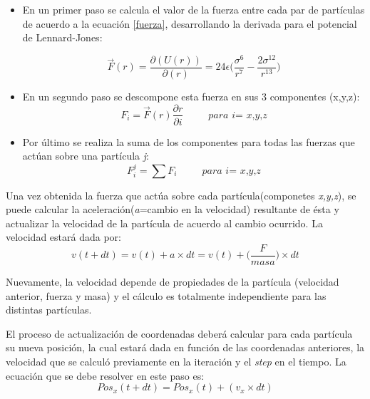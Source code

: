 \begin{itemize}
\item En un primer paso se calcula el valor de la fuerza entre cada par de partículas de acuerdo a la ecuación \ref{fuerza}, desarrollando la derivada para el potencial de Lennard-Jones:

\begin{equation} 
  \vec{F}(r)=\dfrac{\partial(U(r)) }{ \partial(r)}  =  24\epsilon \bigg(\dfrac{{\sigma}^{6}}{{r}^{7}} - \dfrac{2{\sigma}^{12}} {{r}^{13}}\bigg)
\end{equation}


\item En un segundo paso se descompone esta fuerza en sus 3 componentes (x,y,z): \begin{equation}                                                                                
F_i=\vec{F}(r)\dfrac{\partial r}{\partial i}  \hspace{30pt} \textit{para i= x,y,z}
                                                                                 \end{equation}

\item Por último se realiza la suma de los componentes para todas las fuerzas que actúan sobre una partícula \textit{j}: 
\begin{equation}
F^j_i=\sum F_i	\hspace{30pt} \textit{para i= x,y,z}
\end{equation}

\end{itemize}



Una vez obtenida la fuerza que actúa sobre cada partícula(componetes \textit{x,y,z}), se puede calcular la aceleración(\textit{a}=cambio en la velocidad) resultante de ésta y actualizar la velocidad de la partícula de acuerdo al cambio ocurrido.
La velocidad estará dada por:
 \begin{equation} 
    v(t+dt)= v(t) + a\times dt =  v(t) + \bigg(\frac{F}{masa}\bigg)\times dt
 \end{equation}

Nuevamente, la velocidad depende de propiedades de la partícula (velocidad anterior, fuerza y masa) y el cálculo es totalmente independiente para las distintas partículas.  


El proceso de actualización de coordenadas deberá calcular para cada partícula su nueva posición, la cual estará dada en función de las coordenadas anteriores, la velocidad que se calculó previamente en la iteración y el \textit{step} en el tiempo. 
La ecuación que se debe resolver en este paso es:
\begin{equation} 
    Pos_x(t+dt)= Pos_x(t) + (v_x \times dt)
\end{equation}

